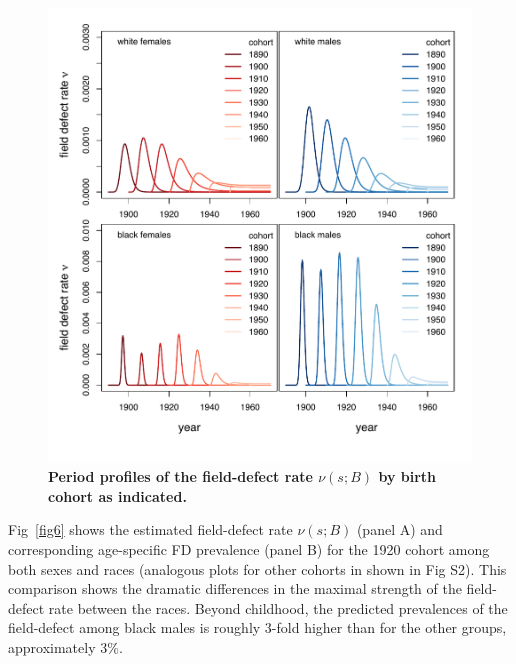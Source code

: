 \documentclass[10pt,letterpaper]{article}
\begin{document}
\begin{figure}[t]
\includegraphics[scale=0.8, trim=0 0 0 40]{FEFFrates_SEER9-2016_panel.pdf}
\caption{{\bf Period profiles of the field-defect rate $\nu(s;B)$ by birth cohort as indicated.}}
\label{fig5}
\end{figure}

Fig~\ref{fig6} shows the estimated field-defect rate $\nu(s; B)$ (panel A) and corresponding age-specific FD prevalence (panel B) for the 1920 cohort among both sexes and races (analogous plots for other cohorts in shown in Fig S2). This comparison shows the dramatic differences in the maximal strength of the field-defect rate between the races. Beyond childhood, the predicted prevalences of the field-defect among black males is roughly 3-fold higher than for the other groups, approximately 3$\%$.     
\end{document}
